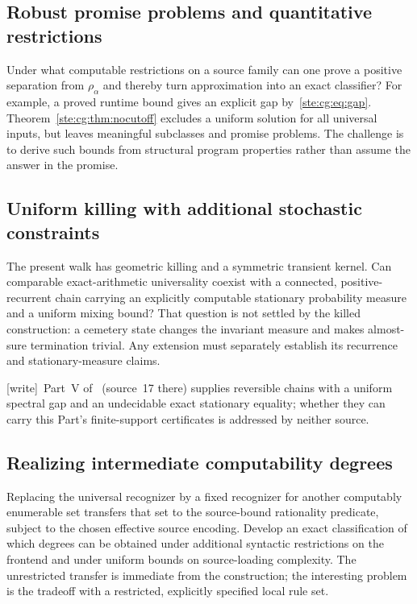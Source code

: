 \documentclass[11pt,letterpaper]{article}
\theoremstyle{definition}
\theoremstyle{remark}
\newcommand{\wtag}{\textup{[write]}}
\begin{document}
\subsection{Robust promise problems and quantitative restrictions}\label{ste:cg:q:promise}
Under what computable restrictions on a source family can one prove a
positive separation from $\rho_\alpha$ and thereby turn approximation into
an exact classifier? For example, a proved runtime bound gives an explicit
gap by~\eqref{ste:cg:eq:gap}. Theorem~\ref{ste:cg:thm:nocutoff} excludes a uniform solution
for all universal inputs, but leaves meaningful subclasses and promise
problems. The challenge is to derive such bounds from structural program
properties rather than assume the answer in the promise.

\subsection{Uniform killing with additional stochastic constraints}\label{ste:cg:q:killing}
The present walk has geometric killing and a symmetric transient kernel.
Can comparable exact-arithmetic universality coexist with a connected,
positive-recurrent chain carrying an explicitly computable stationary
probability measure and a uniform mixing bound? That question is not
settled by the killed construction: a cemetery state changes the invariant
measure and makes almost-sure termination trivial. Any extension must
separately establish its recurrence and stationary-measure claims.

\wtag\ Part~V of~\cite{pqc} (source~17 there) supplies reversible chains with a uniform spectral gap and an undecidable exact stationary equality; whether they can carry this Part's finite-support certificates is addressed by neither source.

\subsection{Realizing intermediate computability degrees}\label{ste:cg:q:degrees}
Replacing the universal recognizer by a fixed recognizer for another
computably enumerable set transfers that set to the source-bound
rationality predicate, subject to the chosen effective source encoding.
Develop an exact classification of which degrees can be obtained under
additional syntactic restrictions on the frontend and under uniform
bounds on source-loading complexity. The unrestricted transfer is immediate
from the construction; the interesting problem is the tradeoff with a
restricted, explicitly specified local rule set.
\end{document}
